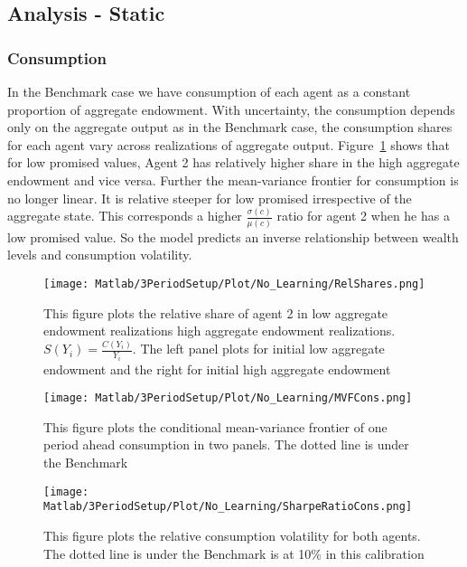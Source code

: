 \documentclass[12pt]{article}
\begin{document}
\subsection{Analysis - Static}
\subsubsection{Consumption}
\noindent In the Benchmark case we have consumption of each agent as a constant proportion of aggregate endowment. With uncertainty, the consumption depends only on the aggregate output as in the Benchmark case, the consumption shares for each agent vary across realizations of aggregate output. Figure~\ref{fig:RelShares}  shows that for low promised values, Agent 2 has relatively higher share in the high aggregate endowment and vice versa. Further the mean-variance frontier for consumption is no longer linear. It is relative steeper for low promised irrespective of the aggregate state. This corresponds a higher $\frac{\sigma(c)}{\mu(c)}$ ratio for agent 2 when he has a low promised value. So the model predicts an inverse relationship between wealth levels and consumption volatility.

\begin{figure}[htbp]
\centering
	  \texttt{[image: Matlab/3PeriodSetup/Plot/No\_Learning/RelShares.png]}

	\caption{This figure plots the relative share of agent 2 in low aggregate endowment realizations high aggregate endowment realizations. $S(Y_i)=\frac{C(Y_i)}{Y_i}$. The left panel plots for initial low aggregate endowment and the right for initial high aggregate endowment}
	\label{fig:RelShares}
\end{figure}

\begin{figure}[htbp]
\centering
	  \texttt{[image: Matlab/3PeriodSetup/Plot/No\_Learning/MVFCons.png]}

	\caption{This figure plots the conditional mean-variance frontier of one period ahead consumption in two panels. The dotted line is under the Benchmark }
	\label{fig:MVFCons}
\end{figure}

\begin{figure}[htbp]
\centering
	  \texttt{[image: Matlab/3PeriodSetup/Plot/No\_Learning/SharpeRatioCons.png]}

	\caption{This figure plots the relative consumption volatility for both agents. The dotted line is under the Benchmark is at 10\% in this calibration}
	\label{fig:SharpeRatioCons}
\end{figure}
\end{document}
